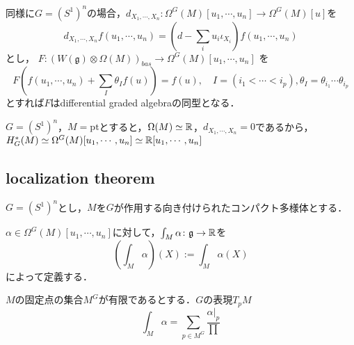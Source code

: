 \begin{eg}
  同様に$G=(S^1)^n$の場合，$d_{X_1,\cdots,X_n}\colon\Omega^G(M)[u_1,\cdots,u_n]\rightarrow\Omega^G(M)[u]$を
  \[
  d_{X_1,\cdots,X_n}f(u_1,\cdots,u_n) =(d-\sum_{i}u_i\iota_{X_i})f(u_1,\cdots,u_n) 
  \]
  とし，
  $
  F\colon (W(\mathfrak{g})\otimes\Omega(M))_{bas}\rightarrow \Omega^G(M)[u_1,\cdots,u_n]
  $
  を
  \[
  F(f(u_1,\cdots,u_n) + \sum_{I}\theta_If(u)) = f(u),\quad I=(i_1<\cdots<i_p),\theta_I = \theta_{i_1}\cdots\theta_{i_p}
  \]
  とすれば$F$はdifferential graded algebraの同型となる．
\end{eg}

\begin{eg}
  $G=(S^1)^n$，$M=\text{pt}$とすると，$\Omega(M)\simeq\mathbb{R}$，$d_{X_1,\cdots,X_n} = 0$であるから，$H^*_G(M)\simeq\Omega^G(M)[u_1,\cdots,u_n]\simeq \mathbb{R}[u_1,\cdots,u_n]$
\end{eg}




\subsection{localization theorem}


$G=(S^1)^n$とし，$M$を$G$が作用する向き付けられたコンパクト多様体とする．

\begin{defin}
  $\alpha\in\Omega^G(M)[u_1,\cdots,u_n]$に対して，$\int_M\alpha\colon\mathfrak{g}\rightarrow\mathbb{R}$を
  \[
  \left(\int_M\alpha\right)(X) := \int_M\alpha(X)
  \]
  によって定義する．
\end{defin}

\begin{theo}
  $M$の固定点の集合$M^G$が有限であるとする．$G$の表現$T_pM$
  \[
  \int_M\alpha = \sum_{p\in M^G}\frac{\alpha|_p}{\prod_{}}
  \]
\end{theo}

